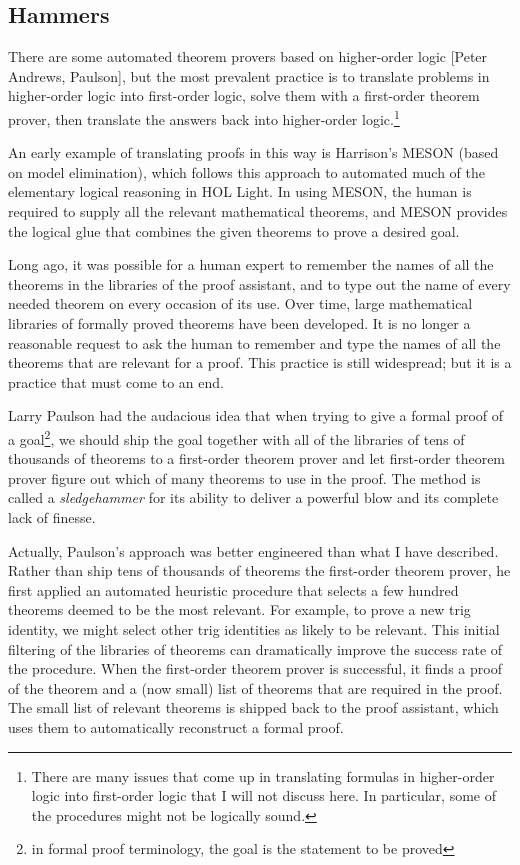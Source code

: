 \documentclass[brochure,english,12pt]{bourbaki}
\theoremstyle{plain}
\begin{document}
\subsection{Hammers}

There are some automated theorem provers based on higher-order logic [Peter Andrews, Paulson],
but the most prevalent practice is to translate problems in higher-order logic into first-order logic,
solve them with a first-order theorem prover, 
then translate the answers back into higher-order logic.\footnote{There are many
issues that come up in translating formulas in higher-order logic into first-order logic that I will not
discuss here.  In particular, some of the procedures might not be logically sound.}

An early example of translating proofs in this way is Harrison's MESON (based on model elimination), 
which follows this approach
to automated much of the elementary logical reasoning in HOL Light.  In using MESON, the human
is required to supply all the relevant mathematical theorems, and MESON provides the logical
glue that combines the given theorems to prove a desired goal.   

Long ago, it was possible for a human expert to remember the names of all the theorems in the libraries
of the proof assistant, and to type out the name of every needed theorem on every occasion of its use.
Over time, large  mathematical libraries of formally proved theorems have been developed.  It is no longer
a reasonable request to ask the human to remember and type the names of all the theorems that are relevant
for a proof.  
This practice is still widespread; but it is a practice that must come to an end.

Larry Paulson had the audacious idea that when trying to give a formal proof 
of a goal\footnote{in formal proof terminology, the goal is the statement to be proved}, we should
ship the goal together with all of the libraries of tens of thousands of theorems to a first-order theorem prover
and let first-order theorem prover figure out which of many theorems to use in the proof.  
The method is called a {\it sledgehammer}  for its ability to deliver a powerful blow and its complete lack of finesse.

Actually, Paulson's approach was better engineered than what I have described.  Rather than ship tens of thousands
of theorems the first-order theorem prover, 
he first applied an automated heuristic procedure that selects a few hundred theorems
deemed to be the most relevant.  For example, to prove a new trig identity, we might select other
trig identities as likely to be relevant.  This initial filtering of the libraries of theorems can dramatically
improve the success rate of the procedure.  When the first-order theorem prover is successful, it finds
a proof of the theorem and a (now small) list of theorems that are required in the proof.  
The small list of relevant theorems is shipped back to the proof assistant, which uses them to automatically
reconstruct a formal proof.
\end{document}
